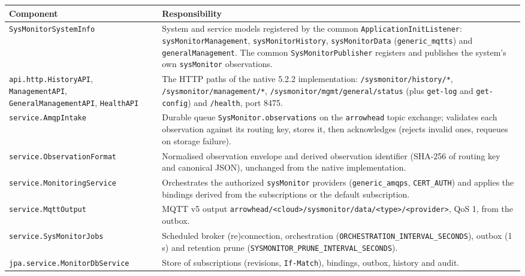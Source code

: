 \documentclass[a4paper]{arrowhead}
\begin{document}
\noindent\begin{longtable}{| p{5.6cm} | p{9.6cm} |} \hline
\rowcolor{gray!33} Component & Responsibility \\ \hline \endhead
\texttt{SysMonitorSystemInfo} & System and service models registered by the common \texttt{ApplicationInitListener}: \texttt{sysMonitorManagement}, \texttt{sysMonitorHistory}, \texttt{sysMonitorData} (\texttt{generic\_\allowbreak{}mqtts}) and \texttt{generalManagement}. The common \texttt{SysMonitorPublisher} registers and publishes the system's own \texttt{sysMonitor} observations. \\ \hline
\texttt{api.\allowbreak{}http.\allowbreak{}HistoryAPI}, \texttt{ManagementAPI}, \texttt{GeneralManagementAPI}, \texttt{HealthAPI} & The HTTP paths of the native 5.2.2 implementation: \texttt{/sysmonitor/\allowbreak{}history/\allowbreak{}*}, \texttt{/sysmonitor/\allowbreak{}management/\allowbreak{}*}, \texttt{/sysmonitor/\allowbreak{}mgmt/\allowbreak{}general/\allowbreak{}status} (plus \texttt{get-\allowbreak{}log} and \texttt{get-\allowbreak{}config}) and \texttt{/health}, port 8475. \\ \hline
\texttt{service.\allowbreak{}AmqpIntake} & Durable queue \texttt{SysMonitor.\allowbreak{}observations} on the \texttt{arrowhead} topic exchange; validates each observation against its routing key, stores it, then acknowledges (rejects invalid ones, requeues on storage failure). \\ \hline
\texttt{service.\allowbreak{}ObservationFormat} & Normalised observation envelope and derived observation identifier (SHA-256 of routing key and canonical JSON), unchanged from the native implementation. \\ \hline
\texttt{service.\allowbreak{}MonitoringService} & Orchestrates the authorized \texttt{sysMonitor} providers (\texttt{generic\_\allowbreak{}amqps}, \texttt{CERT\_\allowbreak{}AUTH}) and applies the bindings derived from the subscriptions or the default subscription. \\ \hline
\texttt{service.\allowbreak{}MqttOutput} & MQTT v5 output \texttt{arrowhead/\allowbreak{}<cloud>/\allowbreak{}sysmonitor/\allowbreak{}data/\allowbreak{}<type>/\allowbreak{}<provider>}, QoS 1, from the outbox. \\ \hline
\texttt{service.\allowbreak{}SysMonitorJobs} & Scheduled broker (re)connection, orchestration (\texttt{ORCHESTRATION\_\allowbreak{}INTERVAL\_\allowbreak{}SECONDS}), outbox (1 s) and retention prune (\texttt{SYSMONITOR\_\allowbreak{}PRUNE\_\allowbreak{}INTERVAL\_\allowbreak{}SECONDS}). \\ \hline
\texttt{jpa.\allowbreak{}service.\allowbreak{}MonitorDbService} & Store of subscriptions (revisions, \texttt{If-\allowbreak{}Match}), bindings, outbox, history and audit. \\ \hline
\end{longtable}
\end{document}
